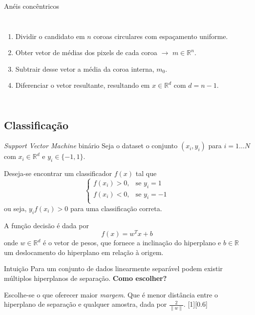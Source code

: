 	\begin{frame}{Anéis concêntricos}
		\begin{columns}
		\begin{enumerate}
			\item Dividir o candidato em $n$ coroas circulares com espaçamento uniforme.
			\item Obter vetor de médias dos pixels de cada coroa $\rightarrow$ $m \in \mathbb{R}^n$. 
			\item Subtrair desse vetor a média da coroa interna, $m_0$.
			\item Diferenciar o vetor resultante, resultando em $x \in \mathbb{R}^d$  com $d=n-1$.
		\end{enumerate}
		\end{columns}
	\end{frame}

\subsection{Classificação}
	\begin{frame}{\textit{Support Vector Machine} binário}
		Seja o dataset o conjunto $(x_i, y_i)$ para $i=1 \dots N$ com $x_i \in \mathbb{R}^d$ e $y_i \in \{-1, 1\}$.

		Deseja-se encontrar um classificador $f(x)$ tal que 
		\begin{equation*}
		\label{eq:svm-decision}
			\begin{cases}
				f(x_i)>0,& \text{se } y_i=1 \\
				f(x_i)<0,& \text{se } y_i=-1 \\
			\end{cases}
		\end{equation*}
		 ou seja, $y_i f(x_i) > 0$ para uma classificação correta. \pause

		A função decisão é dada por
		\begin{equation}
		f(x)=w^T x+ b
		\end{equation} onde $w \in \mathbb{R}^d$ é o vetor de pesos, que fornece a inclinação do hiperplano e $b \in \mathbb{R}$ um deslocamento do hiperplano em relação à origem. 
	\end{frame}

	\begin{frame}{Intuição}
		Para um conjunto de dados linearmente separável podem existir múltiplos hiperplanos de separação. \textbf{Como escolher?} \pause

		Escolhe-se o que oferecer maior \emph{margem}. Que é menor distância entre o hiperplano de separação e qualquer amostra, dada por $\frac{2}{\|w\|}$.
		[1][0.6]
	\end{frame}

